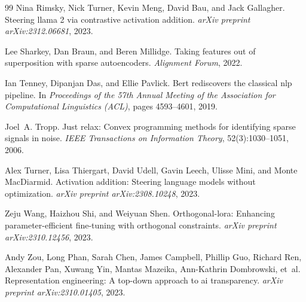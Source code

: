 \documentclass[10pt,twocolumn,letterpaper]{article}
\begin{document}
\begin{thebibliography}{99}
Nina Rimsky, Nick Turner, Kevin Meng, David Bau, and Jack Gallagher.
\newblock Steering llama 2 via contrastive activation addition.
\newblock \emph{arXiv preprint arXiv:2312.06681}, 2023.

Lee Sharkey, Dan Braun, and Beren Millidge.
\newblock Taking features out of superposition with sparse autoencoders.
\newblock \emph{Alignment Forum}, 2022.

Ian Tenney, Dipanjan Das, and Ellie Pavlick.
\newblock Bert rediscovers the classical nlp pipeline.
\newblock In \emph{Proceedings of the 57th Annual Meeting of the Association for Computational Linguistics (ACL)}, pages 4593--4601, 2019.

Joel~A. Tropp.
\newblock Just relax: Convex programming methods for identifying sparse signals in noise.
\newblock \emph{IEEE Transactions on Information Theory}, 52(3):1030--1051, 2006.

Alex Turner, Lisa Thiergart, David Udell, Gavin Leech, Ulisse Mini, and Monte MacDiarmid.
\newblock Activation addition: Steering language models without optimization.
\newblock \emph{arXiv preprint arXiv:2308.10248}, 2023.

Zeju Wang, Haizhou Shi, and Weiyuan Shen.
\newblock Orthogonal-lora: Enhancing parameter-efficient fine-tuning with orthogonal constraints.
\newblock \emph{arXiv preprint arXiv:2310.12456}, 2023.

Andy Zou, Long Phan, Sarah Chen, James Campbell, Phillip Guo, Richard Ren, Alexander Pan, Xuwang Yin, Mantas Mazeika, Ann-Kathrin Dombrowski, et~al.
\newblock Representation engineering: A top-down approach to ai transparency.
\newblock \emph{arXiv preprint arXiv:2310.01405}, 2023.

\end{thebibliography}
\end{document}
